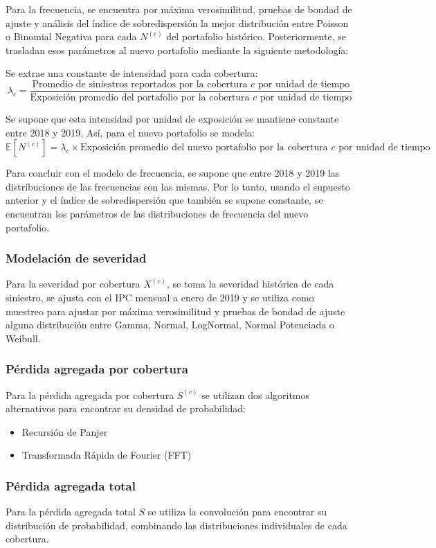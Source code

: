 Para la frecuencia, se encuentra por máxima verosimilitud, pruebas de bondad de ajuste y análisis del índice de sobredispersión la mejor distribución entre Poisson o Binomial Negativa para cada $N^{(c)}$ del portafolio histórico. Posteriormente, se trasladan esos parámetros al nuevo portafolio mediante la siguiente metodología:

Se extrae una constante de intensidad para cada cobertura:
\begin{equation*}
\lambda_c = \frac{\text{Promedio de siniestros reportados por la cobertura } c \text{ por unidad de tiempo}}{\text{Exposición promedio del portafolio por la cobertura } c \text{ por unidad de tiempo}}
\end{equation*}

Se supone que esta intensidad por unidad de exposición se mantiene constante entre 2018 y 2019. Así, para el nuevo portafolio se modela:
\begin{equation*}
\mathbb{E}[N^{(c)}] = \lambda_c \times \text{Exposición promedio del nuevo portafolio por la cobertura } c \text{ por unidad de tiempo}
\end{equation*}

Para concluir con el modelo de frecuencia, se supone que entre 2018 y 2019 las distribuciones de las frecuencias son las mismas. Por lo tanto, usando el supuesto anterior y el índice de sobredispersión que también se supone constante, se encuentran los parámetros de las distribuciones de frecuencia del nuevo portafolio.

\subsubsection{Modelación de severidad}

Para la severidad por cobertura $X^{(c)}$, se toma la severidad histórica de cada siniestro, se ajusta con el IPC mensual a enero de 2019 y se utiliza como muestreo para ajustar por máxima verosimilitud y pruebas de bondad de ajuste alguna distribución entre Gamma, Normal, LogNormal, Normal Potenciada o Weibull.

\subsubsection{Pérdida agregada por cobertura}

Para la pérdida agregada por cobertura $S^{(c)}$ se utilizan dos algoritmos alternativos para encontrar su densidad de probabilidad:
\begin{itemize}
    \item Recursión de Panjer
    \item Transformada Rápida de Fourier (FFT)
\end{itemize}

\subsubsection{Pérdida agregada total}

Para la pérdida agregada total $S$ se utiliza la convolución para encontrar su distribución de probabilidad, combinando las distribuciones individuales de cada cobertura.